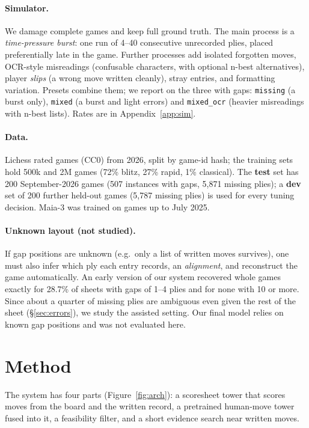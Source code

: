 \documentclass[11pt]{article}
\begin{document}
\paragraph{Simulator.} We damage complete games and keep full ground truth. The main process is a \emph{time-pressure burst}: one run of 4--40 consecutive unrecorded plies, placed preferentially late in the game. Further processes add isolated forgotten moves, OCR-style misreadings (confusable characters, with optional n-best alternatives), player \emph{slips} (a wrong move written cleanly), stray entries, and formatting variation. Presets combine them; we report on the three with gaps: \texttt{missing} (a burst only), \texttt{mixed} (a burst and light errors) and \texttt{mixed\_ocr} (heavier misreadings with n-best lists). Rates are in Appendix~\ref{app:sim}.

\paragraph{Data.} Lichess rated games \citep{lichessdb} (CC0) from 2026, split by game-id hash; the training sets hold 500k and 2M games (72\% blitz, 27\% rapid, 1\% classical). The \textbf{test} set has 200 September-2026 games (507 instances with gaps, 5,871 missing plies); a \textbf{dev} set of 200 further held-out games (5,787 missing plies) is used for every tuning decision. Maia-3 was trained on games up to July 2025.

\paragraph{Unknown layout (not studied).} If gap positions are unknown (e.g.\ only a list of written moves survives), one must also infer which ply each entry records, an \emph{alignment}, and reconstruct the game automatically. An early version of our system recovered whole games exactly for 28.7\% of sheets with gaps of 1--4 plies and for none with 10 or more. Since about a quarter of missing plies are ambiguous even given the rest of the sheet (\S\ref{sec:errors}), we study the assisted setting. Our final model relies on known gap positions and was not evaluated here.

\section{Method}
\label{sec:method}

The system has four parts (Figure~\ref{fig:arch}): a scoresheet tower that scores moves from the board and the written record, a pretrained human-move tower fused into it, a feasibility filter, and a short evidence search near written moves.
\end{document}
